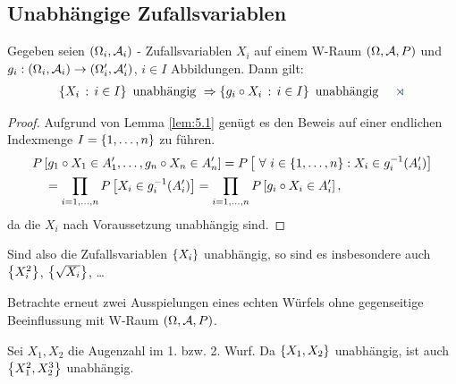 \subsection{Unabhängige Zufallsvariablen}

\begin{prop}
\label{prop:5.1}
Gegeben seien $(\Omega_{i}, \AA_{i})$ - Zufallsvariablen $X_{i} $ auf
einem W-Raum $(\Omega, \AA, P)$ und $g_{i}:(\Omega _{i}, {\cal
A}_{i}) \to (\Omega'_{i},\AA'_{i})$, $ i\in I$ Abbildungen. Dann gilt:
\begin{align*}
\setdef{X_{i}}{i\in I} \mbox{ unabhängig } \Rightarrow \setdef{g_{i}\circ
X_{i}}{i\in I} \mbox{ unabhängig }\fishhere
\end{align*}
\end{prop}
\begin{proof}
Aufgrund von Lemma \ref{lem:5.1} genügt es den Beweis auf einer endlichen
Indexmenge $I=\setd{1,\ldots,n}$ zu führen.
\begin{align*}
&P\left[g_1\circ X_1 \in A_1',\ldots,g_n\circ X_n\in A_n'\right]
=
P\left[ \forall {i\in\setd{1,\ldots,n}} : X_i\in g_i^{-1}(A_i') \right]\\
&\quad
= \prod\limits_{i=1,\ldots,n} P\left[X_i\in g_i^{-1}(A_i')\right] = 
\prod\limits_{i=1,\ldots,n} P\left[g_i\circ X_i \in A_i'\right],
\end{align*}
da die $X_i$ nach Voraussetzung unabhängig sind.\qedhere
\end{proof}

Sind also die Zufallsvariablen $\setd{X_i}$ unabhängig, so sind es
insbesondere auch $\setd{X_i^2}$, $\setd{\sqrt{X_i}}$, \ldots

\begin{bsp}
Betrachte erneut zwei Ausspielungen eines echten Würfels ohne gegenseitige
Beeinflussung mit W-Raum $(\Omega,\AA,P)$.

Sei $X_{1},X_2$ die Augenzahl im 1. bzw. 2. Wurf. Da $\setd{X_1,X_2}$
unabhängig, ist auch $\setd{X_1^2,X_2^3}$ unabhängig.\bsphere
\end{bsp}

